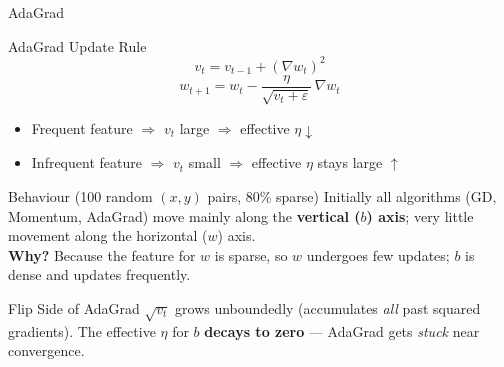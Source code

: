 \documentclass{beamer}
\begin{document}
\begin{frame}[shrink=10]{AdaGrad}
  \begin{block}{AdaGrad Update Rule}
    \[
      v_t = v_{t-1} + (\nabla w_t)^2
    \]
    \[
      \boxed{w_{t+1} = w_t
        - \frac{\eta}{\sqrt{v_t+\varepsilon}}\,\nabla w_t}
    \]
    \begin{itemize}\setlength\itemsep{5pt}
      \item Frequent feature
            $\Rightarrow$ $v_t$ large
            $\Rightarrow$ effective $\eta\!\downarrow$
      \item Infrequent feature
            $\Rightarrow$ $v_t$ small
            $\Rightarrow$ effective $\eta$ stays large $\uparrow$
    \end{itemize}
  \end{block}

  \medskip

  \begin{block}{Behaviour (100 random $(x,y)$ pairs, 80\% sparse)}
    Initially all algorithms (GD, Momentum, AdaGrad) move mainly along
    the \textbf{vertical ($b$) axis}; very little movement along the
    horizontal ($w$) axis.\\[4pt]
    \textbf{Why?} Because the feature for $w$ is sparse, so $w$
    undergoes few updates; $b$ is dense and updates frequently.
  \end{block}

  \medskip

  \begin{alertblock}{Flip Side of AdaGrad}
    $\sqrt{v_t}$ grows unboundedly (accumulates \emph{all} past squared
    gradients).
    The effective $\eta$ for $b$ \textbf{decays to zero} ---
    AdaGrad gets \emph{stuck} near convergence.
  \end{alertblock}
\end{frame}
\end{document}

